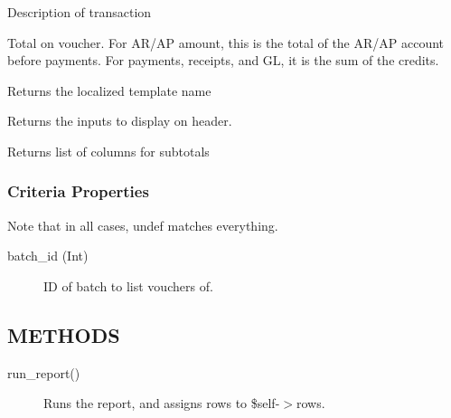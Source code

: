 \begin{description}
\begin{description}
\begin{description}
\begin{description}
\begin{description}
\begin{description}
\begin{description}
\begin{description}
\begin{description}
\begin{description}
\begin{description}
\begin{description}
Description of transaction


\item[{amount}] \mbox{}

Total on voucher.  For AR/AP amount, this is the total of the AR/AP account 
before payments.  For payments, receipts, and GL, it is the sum of the credits.

\end{description}

\item[{name}] \mbox{}

Returns the localized template name


\item[{header\_lines}] \mbox{}

Returns the inputs to display on header.


\item[{subtotal\_cols}] \mbox{}

Returns list of columns for subtotals

\end{description}
\subsubsection*{Criteria Properties\label{LedgerSMB::DBObject::Report::Unapproved::Batch_Detail_Criteria_Properties}}


Note that in all cases, undef matches everything.

\begin{description}

\item[{batch\_id (Int)}] \mbox{}

ID of batch to list vouchers of.

\end{description}
\subsection*{METHODS\label{LedgerSMB::DBObject::Report::Unapproved::Batch_Detail_METHODS}}
\begin{description}

\item[{run\_report()}] \mbox{}

Runs the report, and assigns rows to \$self-$>$rows.

\end{description}

\end{description}
\end{description}
\end{description}
\end{description}
\end{description}
\end{description}
\end{description}
\end{description}
\end{description}
\end{description}
